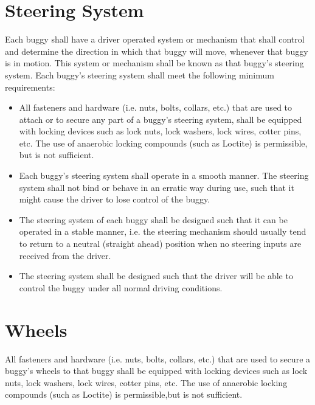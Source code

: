 \section{Steering System}

	Each buggy shall have a driver operated system or mechanism that shall control
	and determine the direction in which that buggy will move, whenever that buggy
	is in motion. This system or mechanism shall be known as that buggy's steering
	system. Each buggy's steering system shall meet the following minimum
	requirements:

	\begin{itemize}

		\item
		All fasteners and hardware (i.e. nuts, bolts, collars, etc.) that are used to
		attach or to secure any part of a buggy's steering system, shall be equipped
		with locking devices such as lock nuts, lock washers, lock wires, cotter pins,
		etc. The use of anaerobic locking compounds (such as Loctite) is permissible,
		but is not sufficient.

		\item
		Each buggy's steering system shall operate in a smooth manner. The steering
		system shall not bind or behave in an erratic way during use, such that it
		might cause the driver to lose control of the buggy.

		\item
		The steering system of each buggy shall be designed such that it can be
		operated in a stable manner, i.e. the steering mechanism should usually tend to
		return to a neutral (straight ahead) position when no steering inputs are
		received from the driver.

		\item
		The steering system shall be designed such that the driver will be able to
		control the buggy under all normal driving conditions.

	\end{itemize}

\section{Wheels}

	All fasteners and hardware (i.e. nuts, bolts, collars, etc.) that are used to
	secure a buggy's wheels to that buggy shall be equipped with locking devices
	such as lock nuts, lock washers, lock wires, cotter pins, etc. The use of
	anaerobic locking compounds (such as Loctite) is permissible,but is not
	sufficient.

